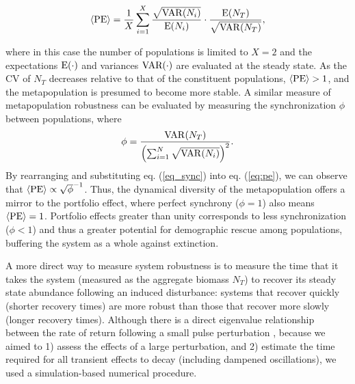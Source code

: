 \documentclass[twocolumn,preprintnumbers,amsmath,amssymb,superscriptaddress]{revtex4}
\begin{document}
\begin{equation}
\langle{\rm PE}\rangle =\frac{1}{X}\sum_{i=1}^{X} \frac{\sqrt{{\rm VAR}(N_i)}}{{\rm E}(N_i)}\cdot \frac{{\rm E}(N_T)}{\sqrt{{\rm VAR}(N_T)}},
\label{eq:pe}
\end{equation}

\noindent where in this case the number of populations is limited to $X=2$ and the expectations $\rm E(\cdot)$ and variances $\rm VAR(\cdot)$ are evaluated at the steady state.
As the CV of $N_T$ decreases relative to that of the constituent populations, $\langle{\rm PE}\rangle > 1$, and the metapopulation is presumed to become more stable.
{\color{red} A similar measure of metapopulation robustness can be evaluated by measuring the synchronization $\phi$ between populations, where 
\begin{equation}
\label{eq_sync}
\phi = \frac{{\rm VAR}(N_T)}{\left(\sum_{i=1}^N\sqrt{{\rm VAR}(N_i)}\right)^2}.
\end{equation}
By rearranging and substituting eq. (\ref{eq_sync}) into eq. (\ref{eq:pe}), we can observe that $\langle{\rm PE}\rangle \propto \sqrt{\phi}^{-1}$.
Thus, the dynamical diversity of the metapopulation offers a mirror to the portfolio effect, where perfect synchrony ($\phi = 1$) also means $\langle{\rm PE}\rangle = 1$.}
Portfolio effects greater than unity corresponds to less synchronization ($\phi < 1$) \cite{Loreau:2008ju,Anderson:2014cx,Yeakel:2013vz} and thus a greater potential for demographic rescue among populations, buffering the system as a whole against extinction. 

A more direct way to measure system robustness is to measure the time that it takes the system (measured as the aggregate biomass $N_T$) to recover its steady state abundance following an induced disturbance: systems that recover quickly (shorter recovery times) are more robust than those that recover more slowly (longer recovery times).
Although there is a direct eigenvalue relationship between the rate of return following a small pulse perturbation \cite{GuckHolmes}, because we aimed to 1) assess the effects of a large perturbation, and 2) estimate the time required for all transient effects to decay (including dampened oscillations), we used a simulation-based numerical procedure.
\end{document}
